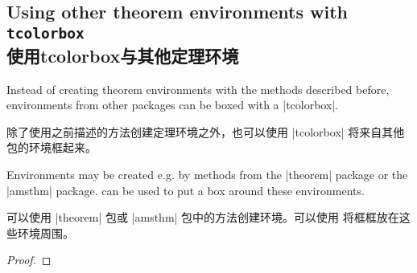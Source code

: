 %
\subsection{Using other theorem environments with \texttt{tcolorbox}\\使用tcolorbox与其他定理环境}\label{subsec:theorems_other}

Instead of creating theorem environments with the methods described before,
environments from other packages can be boxed with a |tcolorbox|.

除了使用之前描述的方法创建定理环境之外，也可以使用 |tcolorbox| 将来自其他包的环境框起来。

Environments may be created e.g. by methods from the |theorem| package or
the |amsthm| package.  can be used to put a box
around these environments.

可以使用 |theorem| 包或 |amsthm| 包中的方法创建环境。可以使用  将框框放在这些环境周围。


\begin{dispExample}
\begin{lem}
  \lipsum[2]
\end{lem}

\lipsum[3]

\begin{proof}
  \lipsum*[4]
\end{proof}
\end{dispExample}